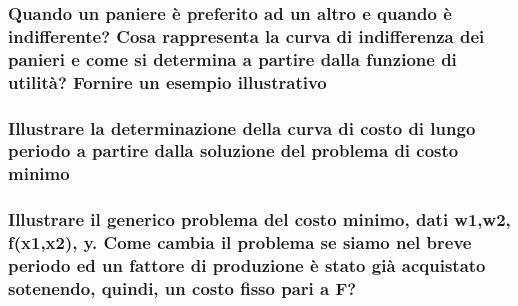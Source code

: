 \documentclass{article}
\begin{document}
\subsubsection{Quando un paniere è preferito ad un altro e quando è indifferente? Cosa rappresenta la curva di indifferenza dei panieri e come si determina a partire dalla funzione di utilità? Fornire un esempio illustrativo}
\subsubsection{Illustrare la determinazione della curva di costo di lungo periodo a partire dalla soluzione del problema di costo minimo}
\subsubsection{Illustrare il generico problema del costo minimo, dati w1,w2, f(x1,x2), y. Come cambia il problema se siamo nel breve periodo ed un fattore di produzione è stato già acquistato sotenendo, quindi, un costo fisso pari a F?}
\end{document}
